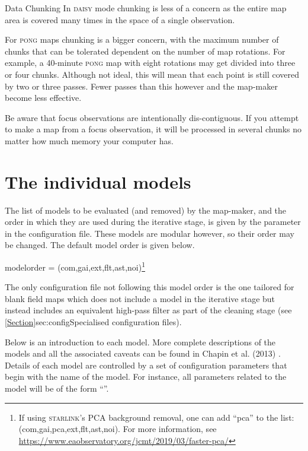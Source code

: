 \begin{sltextbox}{Data Chunking}
  In \textsc{daisy} mode chunking is less of a concern as the entire
  map area is covered many times in the space of a single observation.

  For \textsc{pong} maps chunking is a bigger concern, with the
  maximum number of chunks that can be tolerated dependent on the
  number of map rotations. For example, a 40-minute \textsc{pong} map
  with eight rotations may get divided into three or four
  chunks. Although not ideal, this will mean that each point is still
  covered by two or three passes. Fewer passes than this however and
  the map-maker become less effective.

  Be aware that focus observations are intentionally dis-contiguous. If
  you attempt to make a map from a focus observation, it will be
  processed in several chunks no matter how much memory your computer has.
\end{sltextbox}

\section{The individual models}
\label{sec:models}

The list of models to be evaluated (and removed) by the map-maker, and
the order in which they are used during the iterative stage, is given by
the  parameter in the configuration file.
These models are modular however, so their order may be changed. The
default model order is given below.

\begin{terminalv}
modelorder = (com,gai,ext,flt,ast,noi)\footnote{If using \textsc{starlink}'s PCA background removal, one can add ``pca'' to the list: (com,gai,pca,ext,flt,ast,noi). For more information, see \href{https://www.eaobservatory.org/jcmt/2019/03/faster-pca/}{https://www.eaobservatory.org/jcmt/2019/03/faster-pca/}}
\end{terminalv}

The only configuration file not following this model order is the one tailored
for blank field maps which does not include a  model in the
iterative stage but instead includes an equivalent high-pass filter
as part of the cleaning stage (see \cref{Section}{sec:config}{Specialised
configuration files}).

Below is an introduction to each model. More complete descriptions of the
models and all the associated caveats can be found in Chapin et al.
(2013) \cite{mapmaker}. Details of each model are controlled by a set of
configuration parameters that begin with the name of the model. For
instance, all parameters related to the  model will be of the
form ``''.

